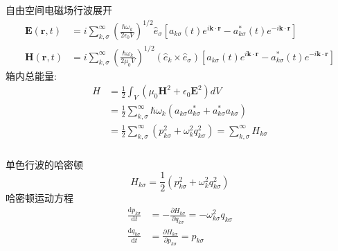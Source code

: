 \begin{frame}
      \frametitle{}
    自由空间电磁场行波展开
      \[   \begin{aligned}
        \mathbf{E} (\mathbf{r},t) &=i \sum^\infty _{k,\sigma} (\frac{\hbar\omega_k}{2 \epsilon_0 V } )^{1/2} \hat{e}_\sigma [ a_{k\sigma} (t) e^{i \mathbf{k}\cdot \mathbf{r}} - a ^* _{k\sigma} (t)  e^{-i \mathbf{k}\cdot \mathbf{r}}] \\
      \mathbf{H} (\mathbf{r},t) &=i \sum^\infty _{k,\sigma} (\frac{\hbar\omega_k}{2 \mu_0 V } )^{1/2} (\hat{e}_k \times \hat{e}_\sigma) [ a_{k\sigma} (t) e^{i \mathbf{k}\cdot \mathbf{r}} - a ^* _{k\sigma} (t)  e^{-i \mathbf{k}\cdot \mathbf{r}}] 
      \end{aligned} \]
    箱内总能量:
      \[ \begin{aligned}
        H &= \frac{1}{2} \int_V (\mu_0 \mathbf{H}^2 + \epsilon_0 \mathbf{E}^2) dV \\ 
        &= \frac{1}{2}\sum^\infty _{k,\sigma} \hbar \omega_k (a_{k\sigma} a_{k\sigma} ^* + a_{k\sigma} ^*a_{k\sigma} )   \\ 
        &= \frac{1}{2}\sum^\infty _{k,\sigma} (p_{k\sigma} ^2 + \omega_k ^2 q_{k\sigma} ^2 )  = \sum^\infty _{k,\sigma} H_{k\sigma}
      \end{aligned} 
      \] 
\end{frame}

\begin{frame}
      \frametitle{}
      单色行波的哈密顿
      \[ H_{k\sigma} = \frac{1}{2} (p_{k\sigma} ^2 + \omega_k ^2 q_{k\sigma} ^2)\]
      哈密顿运动方程
        \[ \begin{aligned}
        \frac{\mathrm{d}p_{k\sigma}}{\mathrm{d}t} &= - \frac{\partial H_{k\sigma}}{\partial q_{k\sigma}} = - \omega ^2 _{k\sigma} q_{k\sigma} \\ 
        \frac{\mathrm{d}q_{k\sigma}}{\mathrm{d}t} &= \frac{\partial H_{k\sigma}}{\partial p_{k\sigma}} =p_{k\sigma}
        \end{aligned} 
      \] 
\end{frame}

